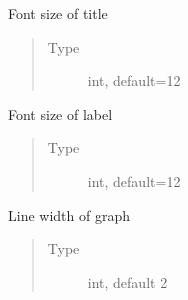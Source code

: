 \documentclass[letterpaper,10pt,english,openany,oneside]{sphinxmanual}
\begin{document}
\begin{fulllineitems}
\begin{fulllineitems}
\end{fulllineitems}


\begin{fulllineitems}
\label{\detokenize{pygpc:pygpc.Visualization.Visualization.Visualisation.font_size_label}}
Font size of title
\begin{quote}\begin{description}
\item[{Type}] \leavevmode
int, default=12

\end{description}\end{quote}

\end{fulllineitems}


\begin{fulllineitems}
Font size of label
\begin{quote}\begin{description}
\item[{Type}] \leavevmode
int, default=12

\end{description}\end{quote}

\end{fulllineitems}


\begin{fulllineitems}
\label{\detokenize{pygpc:pygpc.Visualization.Visualization.Visualisation.graph_lind_width}}
Line width of graph
\begin{quote}\begin{description}
\item[{Type}] \leavevmode
int, default 2

\end{description}\end{quote}


\end{fulllineitems}
\end{fulllineitems}
\end{document}
